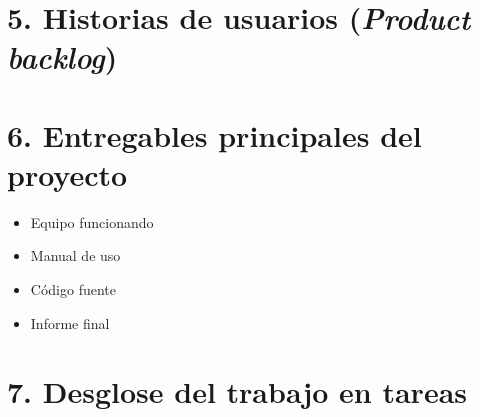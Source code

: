 \documentclass[11pt]{charter}
\begin{document}
\section{5. Historias de usuarios (\textit{Product backlog})}
\label{sec:backlog}

\section{6. Entregables principales del proyecto}
\label{sec:entregables}

\begin{itemize}
\item Equipo funcionando
\item Manual de uso
\item Código fuente
\item Informe final

\end{itemize}


\section{7. Desglose del trabajo en tareas}
\label{sec:wbs}
\end{document}
